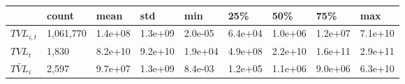 \begin{tabular}{lllllllll}
\toprule
 & count & mean & std & min & 25\% & 50\% & 75\% & max \\
\midrule
$TVL_{i,t}$ & 1,061,770 & 1.4e+08 & 1.3e+09 & 2.0e-05 & 6.4e+04 & 1.0e+06 & 1.2e+07 & 7.1e+10 \\
$TVL_{t}$ & 1,830 & 8.2e+10 & 9.2e+10 & 1.9e+04 & 4.9e+08 & 2.2e+10 & 1.6e+11 & 2.9e+11 \\
$\bar{TVL}_{i}$ & 2,597 & 9.7e+07 & 1.3e+09 & 8.4e-03 & 1.2e+05 & 1.1e+06 & 9.0e+06 & 6.3e+10 \\
\bottomrule
\end{tabular}
